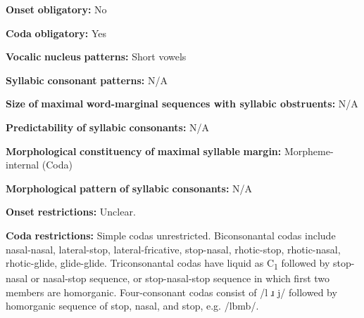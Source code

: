 \begin{styleBody}
\textbf{Onset} \textbf{obligatory:} No
\end{styleBody}

\begin{styleBody}
\textbf{Coda} \textbf{obligatory:} Yes
\end{styleBody}

\begin{styleBody}
\textbf{Vocalic} \textbf{nucleus} \textbf{patterns:} Short vowels
\end{styleBody}

\begin{styleBody}
\textbf{Syllabic} \textbf{consonant} \textbf{patterns:} N/A
\end{styleBody}

\begin{styleBody}
\textbf{Size} \textbf{of} \textbf{maximal} \textbf{word{}-marginal sequences with syllabic obstruents:} N/A
\end{styleBody}

\begin{styleBody}
\textbf{Predictability} \textbf{of} \textbf{syllabic} \textbf{consonants:} N/A
\end{styleBody}

\begin{styleBody}
\textbf{Morphological} \textbf{constituency} \textbf{of} \textbf{maximal} \textbf{syllable} \textbf{margin:} Morpheme-internal (Coda)
\end{styleBody}

\begin{styleBody}
\textbf{Morphological} \textbf{pattern} \textbf{of} \textbf{syllabic} \textbf{consonants:} N/A
\end{styleBody}

\begin{styleBody}
\textbf{Onset} \textbf{restrictions:} Unclear.
\end{styleBody}

\begin{styleBody}
\textbf{Coda} \textbf{restrictions:} Simple codas unrestricted. Biconsonantal codas include nasal-nasal, lateral-stop, lateral-fricative, stop-nasal, rhotic-stop, rhotic-nasal, rhotic-glide, glide-glide. Triconsonantal codas have liquid as C\textsubscript{1} followed by stop-nasal or nasal-stop sequence, or stop-nasal-stop sequence in which first two members are homorganic. Four-consonant codas consist of /l ɹ j/ followed by homorganic sequence of stop, nasal, and stop, e.g. /lbmb/.
\end{styleBody}

